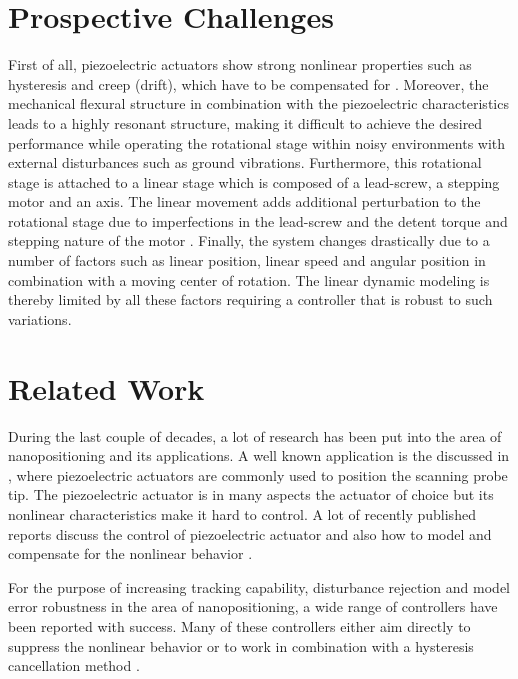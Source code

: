 \newpage
\section{Prospective Challenges}\label{sec:prospectiveChallanges}
First of all, piezoelectric actuators show strong nonlinear properties such as hysteresis and creep (drift), which have to be compensated for \citep{Piezo:2008}. Moreover, the mechanical flexural structure in combination with the piezoelectric characteristics leads to a highly resonant structure, making it difficult to achieve the desired performance while operating the rotational stage within noisy environments with external disturbances such as ground vibrations. Furthermore, this rotational stage is attached to a linear stage which is composed of a lead-screw, a stepping motor and an axis. The linear movement adds additional perturbation to the rotational stage due to imperfections in the lead-screw and the detent torque and stepping nature of the motor \citep{ButcherController:2015}. Finally, the system changes drastically due to a number of factors such as linear position, linear speed and angular position in combination with a moving center of rotation. The linear dynamic modeling is thereby limited by all these factors requiring a controller that is robust to such variations.

\section{Related Work}
During the last couple of decades, a lot of research has been put into the area of nanopositioning and its applications. A well known application is the \abbrAFM discussed in \citep{chuang2013robust, SurveyOfControlIssues:2007}, where piezoelectric actuators are commonly used to position the scanning probe tip. The piezoelectric actuator is in many aspects the actuator of choice but its nonlinear characteristics make it hard to control. A lot of recently published reports discuss the control of piezoelectric actuator \citep{gu2013motion, gu2016modeling} and also how to model and compensate for the nonlinear behavior \citep{Biggio:2014,ButcherIdentification:2015,Maxwell:2012,leang2002hysteresis}.

For the purpose of increasing tracking capability, disturbance rejection and model error robustness in the area of nanopositioning, a wide range of controllers have been reported with success. Many of these controllers either aim directly to suppress the nonlinear behavior \citep{Elmali:1996,ompc, xu2014model} or to work in combination with a hysteresis cancellation method \citep{gu:2014, inputshaper}.

